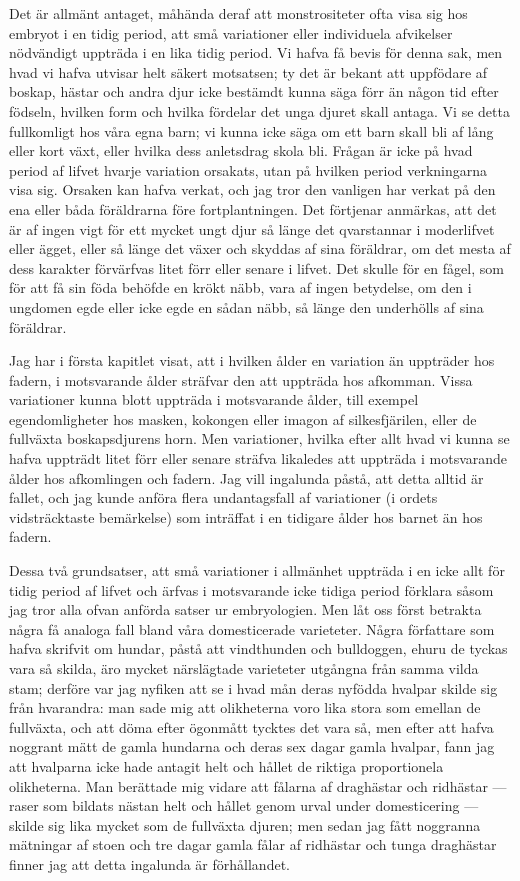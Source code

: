 Det är allmänt antaget, måhända deraf att monstrositeter ofta visa sig hos embryot i en tidig period, att små variationer eller individuela afvikelser nödvändigt uppträda i en lika tidig period. Vi hafva få bevis för denna sak, men hvad vi hafva utvisar helt säkert motsatsen; ty det är bekant att uppfödare af boskap, hästar och andra djur icke bestämdt kunna säga förr än någon tid efter födseln, hvilken form och hvilka fördelar det unga djuret skall antaga. Vi se detta fullkomligt hos våra egna barn; vi kunna icke säga om ett barn skall bli af lång eller kort växt, eller hvilka dess anletsdrag skola bli. Frågan är icke på hvad period af lifvet hvarje variation orsakats, utan på hvilken period verkningarna visa sig. Orsaken kan hafva verkat, och jag tror den vanligen har verkat på den ena eller båda föräldrarna före fortplantningen. Det förtjenar anmärkas, att det är af ingen vigt för ett mycket ungt djur så länge det qvarstannar i moderlifvet eller ägget, eller så länge det växer och skyddas af sina föräldrar, om det mesta af dess karakter förvärfvas litet förr eller senare i lifvet. Det skulle för en fågel, som för att få sin föda behöfde en krökt näbb, vara af ingen betydelse, om den i ungdomen egde eller icke egde en sådan näbb, så länge den underhölls af sina föräldrar.

Jag har i första kapitlet visat, att i hvilken ålder en variation än uppträder hos fadern, i motsvarande ålder sträfvar den att uppträda hos afkomman. Vissa variationer kunna blott uppträda i motsvarande ålder, till exempel egendomligheter hos masken, kokongen eller imagon af silkesfjärilen, eller de fullväxta boskapsdjurens horn. Men variationer, hvilka efter allt hvad vi kunna se hafva uppträdt litet förr eller senare sträfva likaledes att uppträda i motsvarande ålder hos afkomlingen och fadern. Jag vill ingalunda påstå, att detta alltid är fallet, och jag kunde anföra flera undantagsfall af variationer (i ordets vidsträcktaste bemärkelse) som inträffat i en tidigare ålder hos barnet än hos fadern.

Dessa två grundsatser, att små variationer i allmänhet uppträda i en icke allt för tidig period af lifvet och ärfvas i motsvarande icke tidiga period förklara såsom jag tror alla ofvan anförda satser ur embryologien. Men låt oss först betrakta några få analoga fall bland våra domesticerade varieteter. Några författare som hafva skrifvit om hundar, påstå att vindthunden och bulldoggen, ehuru de tyckas vara så skilda, äro mycket närslägtade varieteter utgångna från samma vilda stam; derföre var jag nyfiken att se i hvad mån deras nyfödda hvalpar skilde sig från hvarandra: man sade mig att olikheterna voro lika stora som emellan de fullväxta, och att döma efter ögonmått tycktes det vara så, men efter att hafva noggrant mätt de gamla hundarna och deras sex dagar gamla hvalpar, fann jag att hvalparna icke hade antagit helt och hållet de riktiga proportionela olikheterna. Man berättade mig vidare att fålarna af draghästar och ridhästar — raser som bildats nästan helt och hållet genom urval under domesticering — skilde sig lika mycket som de fullväxta djuren; men sedan jag fått noggranna mätningar af stoen och tre dagar gamla fålar af ridhästar och tunga draghästar finner jag att detta ingalunda är förhållandet.


